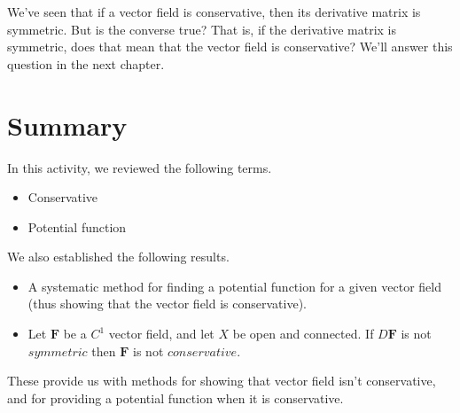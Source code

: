 \documentclass{ximera}
\begin{document}
We've seen that if a vector field is conservative, then its derivative matrix is symmetric. But is the converse true? That is, if the derivative matrix is symmetric, does that mean that the vector field is conservative? We'll answer this question in the next chapter.

\section{Summary}

In this activity, we reviewed the following terms.
\begin{itemize}
\item Conservative
\item Potential function
\end{itemize}

We also established the following results.
\begin{itemize}
\item A systematic method for finding a potential function for a given vector field (thus showing that the vector field is conservative).
\item Let $\mathbf{F}$ be a $C^1$ vector field, and let $X$ be open and connected. If $D\mathbf{F}$ is not $symmetric$ then $\mathbf{F}$ is not $conservative$.
\end{itemize}

These provide us with methods for showing that vector field isn't conservative, and for providing a potential function when it is conservative.
\end{document}
